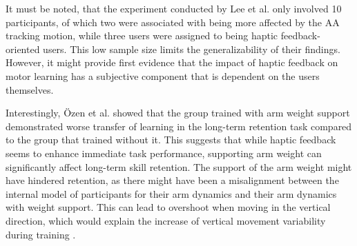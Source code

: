 It must be noted, that the experiment conducted by Lee et al. only involved 10 participants, of which two were associated with being more affected by the AA tracking motion, while three users were assigned to being haptic feedback-oriented users. This low sample size limits the generalizability of their findings. However, it might provide first evidence that the impact of haptic feedback on motor learning has a subjective component that is dependent on the users themselves.

Interestingly, Özen et al. showed that the group trained with arm weight support demonstrated worse transfer of learning in the long-term retention task compared to the group that trained without it. This suggests that while haptic feedback seems to enhance immediate task performance, supporting arm weight can significantly affect long-term skill retention. The support of the arm weight might have hindered retention, as there might have been a misalignment between the internal model of participants for their arm dynamics and their arm dynamics with weight support. This can lead to overshoot when moving in the vertical direction, which would explain the increase of vertical movement variability during training \cite{Oezen2022}. 



